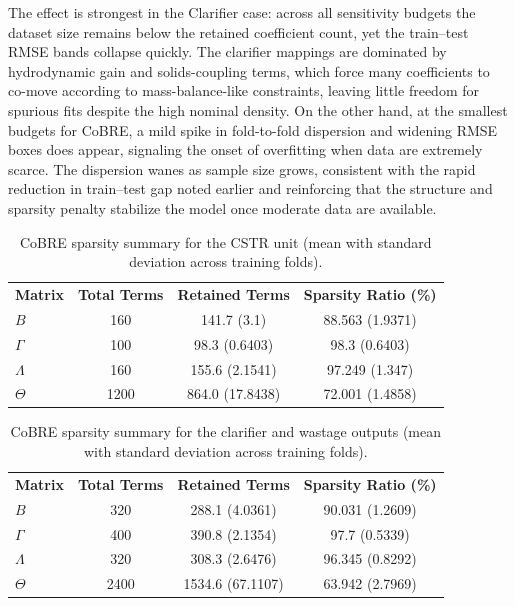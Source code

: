 \documentclass{article}
\begin{document}
The effect is strongest in the Clarifier case: across all sensitivity budgets the dataset size remains below the retained coefficient count, yet the train--test RMSE bands collapse quickly. The clarifier mappings are dominated by hydrodynamic gain and solids-coupling terms, which force many coefficients to co-move according to mass-balance-like constraints, leaving little freedom for spurious fits despite the high nominal density. On the other hand, at the smallest budgets for CoBRE, a mild spike in fold-to-fold dispersion and widening RMSE boxes does appear, signaling the onset of overfitting when data are extremely scarce. The dispersion wanes as sample size grows, consistent with the rapid reduction in train--test gap noted earlier and reinforcing that the structure and sparsity penalty stabilize the model once moderate data are available.

\begin{table}[h]
\centering
\scriptsize
\begin{tabular}{lccc}
\textbf{Matrix} & \textbf{Total Terms} & \textbf{Retained Terms} & \textbf{Sparsity Ratio (\%)} \\
$B$ & 160 & 141.7 (3.1) & 88.563 (1.9371) \\
$\Gamma$ & 100 & 98.3 (0.6403) & 98.3 (0.6403) \\
$\Lambda$ & 160 & 155.6 (2.1541) & 97.249 (1.347) \\
$\Theta$ & 1200 & 864.0 (17.8438) & 72.001 (1.4858) \\
\end{tabular}
\caption{CoBRE sparsity summary for the CSTR unit (mean with standard deviation across training folds).}
\label{tab:sparsity-cstr}
\end{table}

\begin{table}[h]
\centering
\scriptsize
\begin{tabular}{lccc}
\textbf{Matrix} & \textbf{Total Terms} & \textbf{Retained Terms} & \textbf{Sparsity Ratio (\%)} \\
$B$ & 320 & 288.1 (4.0361) & 90.031 (1.2609) \\
$\Gamma$ & 400 & 390.8 (2.1354) & 97.7 (0.5339) \\
$\Lambda$ & 320 & 308.3 (2.6476) & 96.345 (0.8292) \\
$\Theta$ & 2400 & 1534.6 (67.1107) & 63.942 (2.7969) \\
\end{tabular}
\caption{CoBRE sparsity summary for the clarifier and wastage outputs (mean with standard deviation across training folds).}
\label{tab:sparsity-clarifier}
\end{table}
\end{document}
